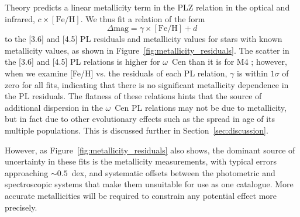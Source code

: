 \documentclass[a4paper,fleqn,usenatbib]{mnras}
\begin{document}
Theory predicts a linear metallicity term in the PLZ relation in the optical and infrared, $c\times[\text{Fe/H}]$.
We thus fit a relation of the form
\begin{equation}
\label{eqn:delta_mag}
\Delta\text{mag} = \gamma \times[\text{Fe/H}] + d
\end{equation}
to the [3.6] and [4.5] PL residuals and metallicity values for stars with known metallicity values, as shown in Figure~\ref{fig:metallicity_residuals}. The scatter in the [3.6] and [4.5] PL relations is higher for $\omega$~Cen than it is for M4 \citep{2015ApJ...808...11N, 2015ApJ...799..165B}; however, when we examine [Fe/H] vs. the residuals of each PL relation, $\gamma$ is within $1\sigma$ of zero for all fits, indicating that there is no significant metallicity dependence in the PL residuals. The flatness of these relations hints that the source of additional dispersion in the $\omega$~Cen PL relations may not be due to metallicity, but in fact due to other evolutionary effects such as the spread in age of its multiple populations. This is discussed further in Section~\ref{sec:discussion}.

However, as Figure~\ref{fig:metallicity_residuals} also shows, the dominant source of uncertainty in these fits is the metallicity measurements, with typical errors approaching $\sim 0.5$~dex, and systematic offsets between the photometric and spectroscopic systems that make them unsuitable for use as one catalogue. More accurate metallicities will be required to constrain any potential effect more precisely.

\end{document}
